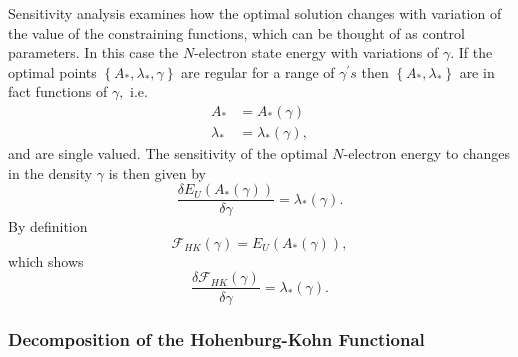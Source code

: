 \documentclass[aps,preprint]{revtex4}%
\begin{document}
Sensitivity analysis \cite{sensitivity} examines how the optimal solution
changes with variation of the value of the constraining functions, which can
be thought of as control parameters. In this case the $N$-electron state
energy with variations of $\gamma.$ If the optimal points $\left\{  A_{\ast
},\lambda_{\ast},\gamma\right\}  $ are regular for a range of $\gamma^{\prime
}s$ then $\left\{  A_{\ast},\lambda_{\ast}\right\}  $ are in fact functions of
$\gamma,$ i.e.
\begin{align}
A_{\ast}  &  =A_{\ast}\left(  \gamma\right) \nonumber\\
\lambda_{\ast}  &  =\lambda_{\ast}\left(  \gamma\right)  ,
\end{align}
and are single valued. The sensitivity of the optimal $N$-electron energy to
changes in the density $\gamma$ is then given by
\begin{equation}
\frac{\delta E_{U}\left(  A_{\ast}\left(  \gamma\right)  \right)  }%
{\delta\gamma}=\lambda_{\ast}\left(  \gamma\right)  .
\end{equation}
By definition
\begin{equation}
\mathcal{F}_{HK}\left(  \gamma\right)  =E_{U}\left(  A_{\ast}\left(
\gamma\right)  \right)  ,
\end{equation}
which shows
\begin{equation}
\frac{\delta\mathcal{F}_{HK}\left(  \gamma\right)  }{\delta\gamma}%
=\lambda_{\ast}\left(  \gamma\right)  .
\end{equation}


\subsubsection{Decomposition of the Hohenburg-Kohn Functional}
\end{document}
